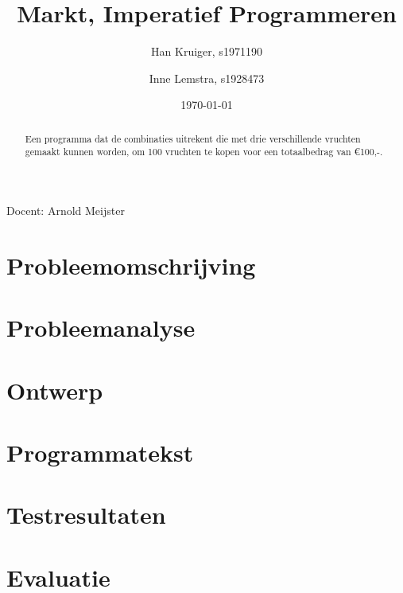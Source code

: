 \documentclass[a4paper,10pt]{article}
\title{Markt, Imperatief Programmeren}
\author{Han Kruiger, s1971190 \and Inne Lemstra, s1928473}
\date{\today}
\begin{document}
\maketitle
Docent: Arnold Meijster

\begin{abstract}
Een programma dat de combinaties uitrekent die met drie verschillende vruchten gemaakt kunnen worden, om 100 vruchten te kopen voor een totaalbedrag van \euro100,-.
\end{abstract}

\section{Probleemomschrijving}

\section{Probleemanalyse}

\section{Ontwerp}

\newpage
\section{Programmatekst}

\newpage
\section{Testresultaten}

\newpage
\section{Evaluatie}

\end{document}

